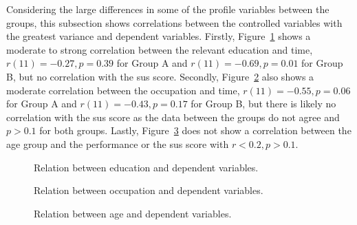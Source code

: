 Considering the large differences in some of the profile variables between the groups, this subsection shows correlations between the controlled variables with the greatest variance and dependent variables.
Firstly, Figure~\ref{fig:plot-correlation-education} shows a moderate to strong correlation between the relevant education and time, $r(11) = -0.27, p = 0.39$ for Group A and $r(11) = -0.69, p = 0.01$ for Group B, but no correlation with the \gls{sus} score.
Secondly, Figure~\ref{fig:plot-correlation-occupation} also shows a moderate correlation between the occupation and time, $r(11) = -0.55, p = 0.06$ for Group A and $r(11) = -0.43, p = 0.17$ for Group B, but there is likely no correlation with the \gls{sus} score as the data between the groups do not agree and $p > 0.1$ for both groups.
Lastly, Figure~\ref{fig:plot-correlation-age} does not show a correlation between the age group and the performance or the \gls{sus} score with $r < 0.2, p > 0.1$.

\begin{figure}[H]
    
    \caption{Relation between education and dependent variables.}
    \label{fig:plot-correlation-education}
\end{figure}

\begin{figure}[H]
    
    \caption{Relation between occupation and dependent variables.}
    \label{fig:plot-correlation-occupation}
\end{figure}

\begin{figure}[H]
    
    \caption{Relation between age and dependent variables.}
    \label{fig:plot-correlation-age}
\end{figure}

